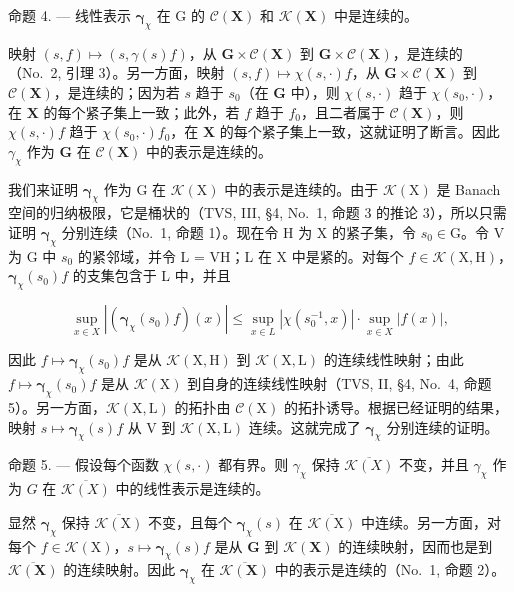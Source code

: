 命题 4. --- 线性表示 \(\pmb{\gamma}_{\chi}\) 在 G 的 \(\mathcal{C}(\mathbf{X})\) 和 \(\mathcal{K}(\mathbf{X})\) 中是连续的。

映射 \((s, f) \mapsto (s, \gamma(s)f)\)，从 \(\mathbf{G} \times \mathcal{C}(\mathbf{X})\) 到 \(\mathbf{G} \times \mathcal{C}(\mathbf{X})\)，是连续的（No.~2, 引理 3）。另一方面，映射 \((s, f) \mapsto \chi(s, \cdot)f\)，从 \(\mathbf{G} \times \mathcal{C}(\mathbf{X})\) 到 \(\mathcal{C}(\mathbf{X})\)，是连续的；因为若 \(s\) 趋于 \(s_0\)（在 \(\mathbf{G}\) 中），则 \(\chi(s, \cdot)\) 趋于 \(\chi(s_0, \cdot)\)，在 \(\mathbf{X}\) 的每个紧子集上一致；此外，若 \(f\) 趋于 \(f_0\)，且二者属于 \(\mathcal{C}(\mathbf{X})\)，则 \(\chi(s, \cdot)f\) 趋于 \(\chi(s_0, \cdot)f_0\)，在 \(\mathbf{X}\) 的每个紧子集上一致，这就证明了断言。因此 \(\gamma_{\chi}\) 作为 \(\mathbf{G}\) 在 \(\mathcal{C}(\mathbf{X})\) 中的表示是连续的。

我们来证明 \(\pmb{\gamma}_{\chi}\) 作为 G 在 \(\mathcal{K}(\mathrm{X})\) 中的表示是连续的。由于 \(\mathcal{K}(\mathrm{X})\) 是 Banach 空间的归纳极限，它是桶状的（TVS, III, §4, No.~1, 命题 3 的推论 3），所以只需证明 \(\pmb{\gamma}_{\chi}\) 分别连续（No.~1, 命题 1）。现在令 H 为 X 的紧子集，令 \(s_0 \in \mathrm{G}\)。令 V 为 G 中 \(s_0\) 的紧邻域，并令 L = VH；L 在 X 中是紧的。对每个 \(f \in \mathcal{K}(\mathrm{X}, \mathrm{H})\)，\(\pmb{\gamma}_{\chi}(s_0)f\) 的支集包含于 L 中，并且

\[
\sup _ {x \in X} | (\boldsymbol {\gamma} _ {\chi} (s _ {0}) f) (x) | \leqslant \sup _ {x \in L} | \chi (s _ {0} ^ {- 1}, x) | \cdot \sup _ {x \in X} | f (x) |,
\]

因此 \(f \mapsto \boldsymbol{\gamma}_{\chi}(s_0)f\) 是从 \(\mathcal{K}(\mathrm{X},\mathrm{H})\) 到 \(\mathcal{K}(\mathrm{X},\mathrm{L})\) 的连续线性映射；由此 \(f \mapsto \boldsymbol{\gamma}_{\chi}(s_0)f\) 是从 \(\mathcal{K}(\mathrm{X})\) 到自身的连续线性映射（TVS, II, §4, No.~4, 命题 5）。另一方面，\(\mathcal{K}(\mathrm{X},\mathrm{L})\) 的拓扑由 \(\mathcal{C}(\mathrm{X})\) 的拓扑诱导。根据已经证明的结果，映射 \(s \mapsto \boldsymbol{\gamma}_{\chi}(s)f\) 从 \(\mathrm{V}\) 到 \(\mathcal{K}(\mathrm{X},\mathrm{L})\) 连续。这就完成了 \(\boldsymbol{\gamma}_{\chi}\) 分别连续的证明。

命题 5. --- 假设每个函数 \(\chi(s,\cdot)\) 都有界。则 \(\gamma_{\chi}\) 保持 \(\overline{\mathcal{K}(X)}\) 不变，并且 \(\gamma_{\chi}\) 作为 \(G\) 在 \(\overline{\mathcal{K}(X)}\) 中的线性表示是连续的。

显然 \(\pmb{\gamma}_{\chi}\) 保持 \(\overline{\mathcal{K}(\mathrm{X})}\) 不变，且每个 \(\pmb{\gamma}_{\chi}(s)\) 在 \(\overline{\mathcal{K}(\mathrm{X})}\) 中连续。另一方面，对每个 \(f \in \mathcal{K}(\mathrm{X})\)，\(s \mapsto \pmb{\gamma}_{\chi}(s)f\) 是从 \(\mathbf{G}\) 到 \(\mathcal{K}(\mathbf{X})\) 的连续映射，因而也是到 \(\overline{\mathcal{K}(\mathbf{X})}\) 的连续映射。因此 \(\pmb{\gamma}_{\chi}\) 在 \(\overline{\mathcal{K}(\mathbf{X})}\) 中的表示是连续的（No.~1, 命题 2）。

